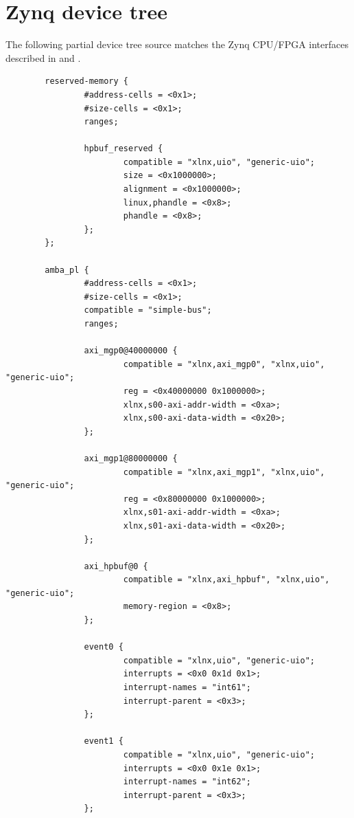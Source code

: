 \pagebreak

\chapter{Zynq device tree}\label{ch:zynq_device_tree}

    The following partial device tree source matches the Zynq CPU/FPGA interfaces
    described in  and .
    
    \begin{verbatim}
        reserved-memory {
                #address-cells = <0x1>;
                #size-cells = <0x1>;
                ranges;

                hpbuf_reserved {
                        compatible = "xlnx,uio", "generic-uio";
                        size = <0x1000000>;
                        alignment = <0x1000000>;
                        linux,phandle = <0x8>;
                        phandle = <0x8>;
                };
        };

        amba_pl {
                #address-cells = <0x1>;
                #size-cells = <0x1>;
                compatible = "simple-bus";
                ranges;

                axi_mgp0@40000000 {
                        compatible = "xlnx,axi_mgp0", "xlnx,uio", "generic-uio";
                        reg = <0x40000000 0x1000000>;
                        xlnx,s00-axi-addr-width = <0xa>;
                        xlnx,s00-axi-data-width = <0x20>;
                };

                axi_mgp1@80000000 {
                        compatible = "xlnx,axi_mgp1", "xlnx,uio", "generic-uio";
                        reg = <0x80000000 0x1000000>;
                        xlnx,s01-axi-addr-width = <0xa>;
                        xlnx,s01-axi-data-width = <0x20>;
                };

                axi_hpbuf@0 {
                        compatible = "xlnx,axi_hpbuf", "xlnx,uio", "generic-uio";
                        memory-region = <0x8>;
                };

                event0 {
                        compatible = "xlnx,uio", "generic-uio";
                        interrupts = <0x0 0x1d 0x1>;
                        interrupt-names = "int61";
                        interrupt-parent = <0x3>;
                };

                event1 {
                        compatible = "xlnx,uio", "generic-uio";
                        interrupts = <0x0 0x1e 0x1>;
                        interrupt-names = "int62";
                        interrupt-parent = <0x3>;
                };


\end{verbatim}
